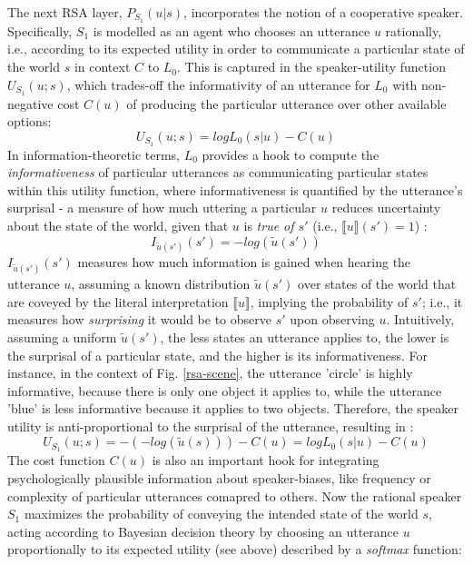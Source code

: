 The next RSA layer, $P_{S_1}(u | s)$, incorporates the notion of a cooperative speaker. Specifically, $S_1$ is modelled as an agent who chooses an utterance $u$ rationally, i.e., according to its expected utility in order to communicate a particular state of the world $s$ in context $C$ to $L_0$. This is captured in the speaker-utility function $U_{S_1}(u; s)$, which trades-off the informativity of an utterance for $L_0$ with non-negative cost $C(u)$ of producing the particular utterance over other available options\parencite{problang}:
$$U_{S_1} (u;s) = log L_0(s | u) - C(u)$$
In information-theoretic terms, $L_0$ provides a hook to compute the \emph{informativeness} of particular utterances as communicating particular states within this utility function, 
where informativeness is quantified by the utterance's surprisal - a measure of how much uttering a particular $u$ reduces uncertainty about the state of the world, given that $u$ is \emph{true of $s'$} (i.e., $\llbracket u \rrbracket (s') = 1$) \parencite{frank2012predicting}: 
$$I_{ \tilde{u} (s')}(s') = -log(\tilde{u} (s'))$$
$I_{\tilde{u} (s')}(s')$ measures how much information is gained when hearing the utterance $u$, assuming a known distribution $\tilde{u} (s')$ over states of the world that are coveyed by the literal interpretation $\llbracket u \rrbracket$, implying the probability of $s'$; i.e., it measures how \emph{surprising} it would be to observe $s'$ upon observing $u$.
Intuitively, assuming a uniform $\tilde{u} (s')$, the less states an utterance applies to, the lower is the surprisal of a particular state, and the higher is its informativeness. For instance, in the context of Fig. \ref{rsa-scene}, the utterance 'circle' is highly informative, because there is only one object it applies to, while the utterance 'blue' is less informative because it applies to two objects. 
Therefore, the speaker utility is anti-proportional to the surprisal of the utterance, resulting in \parencite{frank2012predicting}:
$$U_{S_1} (u;s) = -(-log(\tilde{u}(s))) - C(u) = log L_0(s| u) - C(u)$$  %
The cost function $C(u)$ is also an important hook for integrating psychologically plausible information about speaker-biases, like frequency or complexity of particular utterances comapred to others. Now the rational speaker $S_1$ maximizes the probability of conveying the intended state of the world $s$, acting according to Bayesian decision theory by choosing an utterance $u$ proportionally to its expected utility (see above) described by a \emph{softmax} function:

